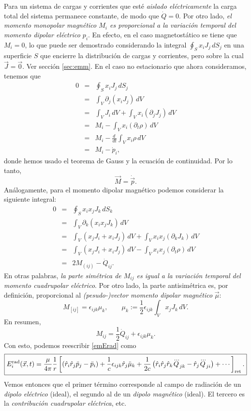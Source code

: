 Para un sistema de cargas y corrientes que esté \textit{aislado eléctricamente} la carga total del sistema permanece constante, de modo que $\dot{Q}=0$. Por otro lado, \textit{el momento monopolar magnético $M_i$ es proporcional a la variación temporal del momento dipolar eléctrico $p_i$}. En efecto, en el caso magnetostático se tiene que $M_i=0$, lo que puede ser demostrado considerando la integral $\oint_Sx_iJ_j\, dS_j$ en una superficie $S$ que encierre la distribución de cargas y corrientes, pero sobre la cual $\vec{J}=\vec{0}$. Ver sección \ref{sec:emm}. En el caso no estacionario que ahora consideramos, tenemos que
\begin{eqnarray}
 0&=&\oint_Sx_iJ_j\, dS_j\\
&=&\int_V\partial_j(x_iJ_j)\,dV \\
&=&\int_VJ_i\,dV+\int_Vx_i(\partial_jJ_j)\,dV \\
&=&M_i-\int_Vx_i(\partial_t\rho)\,dV \\
&=&M_i-\frac{d\ }{dt}\int_Vx_i\rho\,dV \\
&=&M_i-\dot{p}_i,
\end{eqnarray}
donde hemos usado el teorema de Gauss y la ecuación de continuidad. Por lo tanto,
\begin{equation}
 \vec{M}=\dot{\vec{p}}.
\end{equation}
Análogamente, para el momento dipolar magnético podemos considerar la siguiente integral:
\begin{eqnarray}
 0&=&\oint_Sx_ix_jJ_k\, dS_k\\
&=&\int_V\partial_k(x_ix_jJ_k)\,dV \\
&=&\int_V(x_jJ_i+x_iJ_j)\,dV+\int_Vx_ix_j(\partial_kJ_k)\,dV \\
&=&\int_V(x_jJ_i+x_iJ_j)\,dV-\int_Vx_ix_j(\partial_t\rho)\,dV \\
&=&2M_{(ij)}-\dot{Q}_{ij}.
\end{eqnarray}
En otras palabras, \textit{la parte simétrica de $M_{ij}$ es igual a la variación temporal del momento cuadrupolar eléctrico}. Por otro lado, la parte antisimétrica es, por definición, proporcional al \textit{(pesudo-)vector momento dipolar magnético} $\vec{\mu}$:
\begin{equation}
 M_{[ij]}=\epsilon_{ijk}\mu_k, \qquad \mu_k:=\frac{1}{2}\epsilon_{ijk}\int_Vx_jJ_k\,dV.
\end{equation}
En resumen,
\begin{equation}
 M_{ij}=\frac{1}{2}\dot{Q}_{ij}+\epsilon_{ijk}\mu_k.
\end{equation}
Con esto, podemos reescribir \eqref{emErad} como
\begin{equation}
\boxed{E_i^{\rm rad}(\vec{x},t)=\frac{\mu}{4\pi}\frac{1}{r}\left[\left(\hat{r}_i\hat{r}_j\ddot{p}_j-\ddot{p}_i\right)+\frac{1}{c}\epsilon_{ijk}\hat{r}_j\ddot{\mu}_k+\frac{1}{2c}\left(\hat{r}_i\hat{r}_j\hat{r}_k\dddot{Q}_{jk} -\hat{r}_j\dddot{Q}_{ji}\right)+\cdots\right]_{\rm ret} .} \label{emErad2}
\end{equation}
Vemos entonces que el primer término corresponde al campo de radiación de un \textit{dipolo eléctrico} (ideal), el segundo al de un \textit{dipolo magnético} (ideal). El tercero es la \textit{contribución cuadrupolar eléctrica}, etc.


